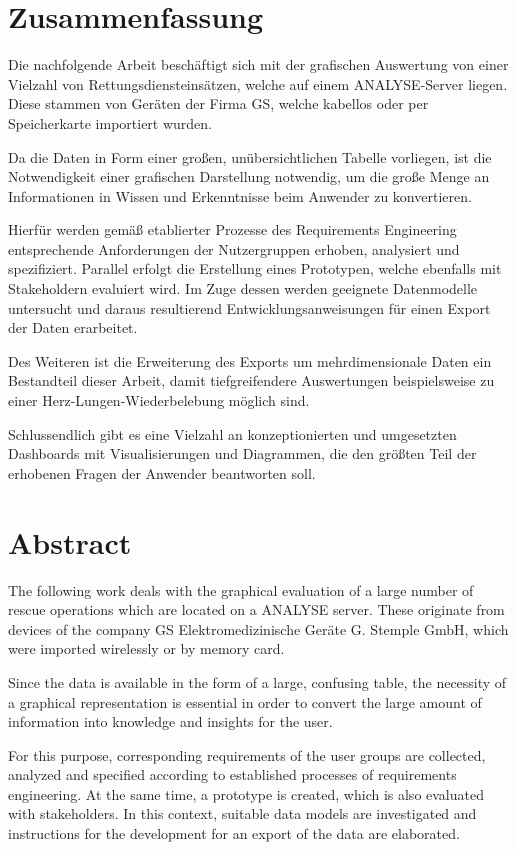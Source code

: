 \newpage\thispagestyle{empty}
\section*{Zusammenfassung}

Die nachfolgende Arbeit beschäftigt sich mit der grafischen Auswertung von einer Vielzahl von Rettungsdiensteinsätzen, welche auf einem \acrlong{ANALYSE}-Server liegen.
Diese stammen von Geräten der Firma \acrlong{GS}, welche kabellos oder per Speicherkarte importiert wurden.

Da die Daten in Form einer großen, unübersichtlichen Tabelle vorliegen, ist die Notwendigkeit einer grafischen Darstellung notwendig, um die große Menge an Informationen in Wissen und Erkenntnisse beim Anwender zu konvertieren.

Hierfür werden gemäß etablierter Prozesse des Requirements Engineering entsprechende Anforderungen der Nutzergruppen erhoben, analysiert und spezifiziert.
Parallel erfolgt die Erstellung eines Prototypen, welche ebenfalls mit Stakeholdern evaluiert wird.
Im Zuge dessen werden geeignete Datenmodelle untersucht und daraus resultierend Entwicklungsanweisungen für einen Export der Daten erarbeitet.

Des Weiteren ist die Erweiterung des Exports um mehrdimensionale Daten ein Bestandteil dieser Arbeit, damit tiefgreifendere Auswertungen beispielsweise zu einer Herz-Lungen-Wiederbelebung möglich sind.

Schlussendlich gibt es eine Vielzahl an konzeptionierten und umgesetzten Dashboards mit Visualisierungen und Diagrammen, die den größten Teil der erhobenen Fragen der Anwender beantworten soll.

\section*{Abstract}
The following work deals with the graphical evaluation of a large number of
rescue operations which are located on a \acrlong{ANALYSE} server.
These originate from devices of the company GS Elektromedizinische Geräte G. Stemple GmbH, which were imported wirelessly or by memory card.

Since the data is available in the form of a large, confusing table, the necessity of a graphical representation is essential in order to convert the large amount of information into knowledge and insights for the user.

For this purpose, corresponding requirements of the user groups are collected, analyzed and specified according to established processes of requirements engineering.
At the same time, a prototype is created, which is also evaluated with stakeholders.
In this context, suitable data models are investigated and instructions for the development for an export of the data are elaborated.

